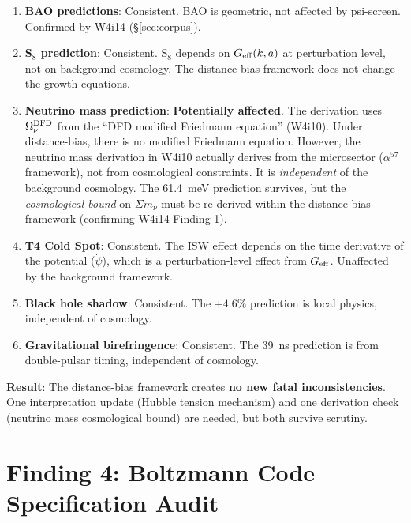 \documentclass[11pt]{article}
\newcommand{\Geff}{G_{\rm eff}}
\begin{document}
\begin{enumerate}[nosep]
\item \textbf{BAO predictions}: Consistent.  BAO is geometric, not
  affected by psi-screen.  Confirmed by W4i14 (\S\ref{sec:corpus}).

\item \textbf{S$_8$ prediction}: Consistent.  S$_8$ depends on
  $\Geff(k,a)$ at perturbation level, not on background cosmology.
  The distance-bias framework does not change the growth equations.

\item \textbf{Neutrino mass prediction}: \textbf{Potentially affected}.
  The derivation uses $\Omega_\nu^{\rm DFD}$ from the ``DFD modified
  Friedmann equation'' (W4i10).  Under distance-bias, there is no
  modified Friedmann equation.  However, the neutrino mass derivation
  in W4i10 actually derives from the microsector ($\alpha^{57}$
  framework), not from cosmological constraints.  It is
  \emph{independent} of the background cosmology.  The 61.4~meV
  prediction survives, but the \emph{cosmological bound} on
  $\Sigma m_\nu$ must be re-derived within the distance-bias framework
  (confirming W4i14 Finding 1).

\item \textbf{T4 Cold Spot}: Consistent.  The ISW effect depends on
  the time derivative of the potential ($\dot\psi$), which is a
  perturbation-level effect from $\Geff$.  Unaffected by the
  background framework.

\item \textbf{Black hole shadow}: Consistent.  The $+4.6\%$ prediction
  is local physics, independent of cosmology.

\item \textbf{Gravitational birefringence}: Consistent.  The 39~ns
  prediction is from double-pulsar timing, independent of cosmology.
\end{enumerate}

\textbf{Result}: The distance-bias framework creates \textbf{no new
fatal inconsistencies}.  One interpretation update (Hubble tension
mechanism) and one derivation check (neutrino mass cosmological bound)
are needed, but both survive scrutiny.


\part{Finding 4: Boltzmann Code Specification Audit}
\label{sec:boltzmann}
\end{document}
